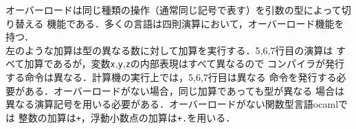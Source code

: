 \documentclass[a4j,dvipdfmx]{jbook}
\begin{document}
オーバーロードは同じ種類の操作（通常同じ記号で表す）を引数の型によって切り替える
機能である．多くの言語は四則演算において，オーバーロード機能を持つ．\\
左のような加算は型の異なる数に対して加算を実行する．5,6,7行目の演算は
すべて加算であるが，変数\verb|x|,\verb|y|,\verb|z|の内部表現はすべて異なるので
コンパイラが発行する命令は異なる．計算機の実行上では，5,6,7行目は異なる
命令を発行する必要がある．オーバーロードがない場合，同じ加算であっても型が異なる
場合は異なる演算記号を用いる必要がある．オーバーロードがない関数型言語ocamlでは
整数の加算は\texttt{+}，浮動小数点の加算は\texttt{+.}を用いる．

\end{document}
